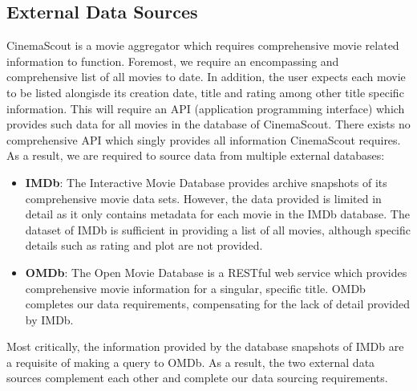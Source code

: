 \documentclass{article}
\begin{document}
\subsection{External Data Sources}
CinemaScout is a movie aggregator which requires comprehensive movie 
related information to function.
Foremost, we require an encompassing and comprehensive list of all
movies to date. In addition, the user expects each movie to be listed alongisde 
its creation date, title and rating among other title specific information. 
This will require an API (application programming interface) which provides 
such data for all movies in the database of CinemaScout.\newline \newline
There exists no comprehensive API which singly provides all information 
CinemaScout requires. As a result, we are required to source data from multiple
external databases:
\begin{itemize}
\item \textbf{IMDb}: The Interactive Movie Database provides archive
snapshots of its comprehensive movie data sets. However, the data provided
is limited in detail as it only contains metadata for each movie in the IMDb
database. The dataset of IMDb is sufficient in providing a list of all movies,
although specific details such as rating and plot are not provided.
\item \textbf{OMDb}: The Open Movie Database is a RESTful web service
which provides comprehensive movie information for a singular, specific title. 
OMDb completes our data requirements, compensating for the lack of detail
provided by IMDb.
\end{itemize}
Most critically, the information provided by the database snapshots of IMDb
are a requisite of making a query to OMDb. As a result, the two external data
sources complement each other and complete our data sourcing requirements.
\end{document}
